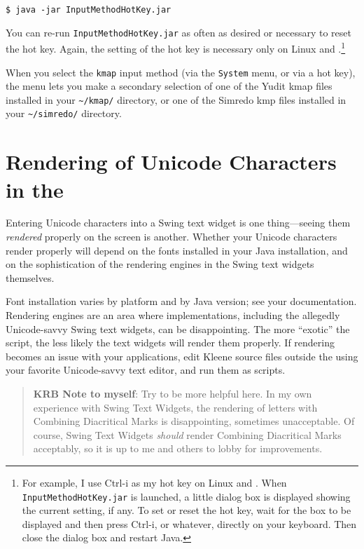 \begin{Verbatim}
$ java -jar InputMethodHotKey.jar
\end{Verbatim}

\noindent
You can re-run \texttt{InputMethodHotKey.jar} as often as desired
or necessary to reset the hot key.
Again, the setting of the hot key is necessary only on Linux and
.\footnote{For example, I use Ctrl-i as my hot key on Linux
and .  When \texttt{InputMethodHotKey.jar} is launched, a
little dialog box is displayed showing the current setting, if any.  To
set or reset the hot key, wait for the box to be displayed and then press
Ctrl-i, or whatever, directly on your keyboard. Then close the dialog box
and restart Java.}

When you select the \texttt{kmap} input method (via the \texttt{System}
menu, or via a hot key), the menu lets you make a secondary selection of
one of the Yudit kmap files installed in your \texttt{\~{}/kmap/}
directory, or one of the Simredo kmp files installed in your
\texttt{\~{}/simredo/} directory.

\section{Rendering of Unicode Characters in the }

Entering Unicode characters into a Swing text widget is one
thing---seeing them \emph{rendered} properly on the screen is another.
Whether your Unicode characters render properly will depend on the fonts
installed in your Java installation, and on the sophistication of the
rendering engines in the Swing text widgets themselves.

Font installation varies by platform and by Java version; see your
documentation.  Rendering engines are an area where
implementations, including the allegedly Unicode-savvy Swing text
widgets, can be disappointing.  The more ``exotic'' the script,
the less likely the text widgets will render them properly.  If
rendering becomes an issue with your applications, edit 
Kleene source files outside the  using your favorite Unicode-savvy text editor,
and run them as scripts.

\begin{quote}
\textbf{KRB Note to myself}: Try to be more helpful here.  In my own
experience with Swing Text Widgets, the rendering of letters with
Combining Diacritical Marks is disappointing, sometimes unacceptable.  Of
course, Swing Text Widgets \emph{should} render Combining Diacritical
Marks acceptably, so it is up to me and others to lobby for improvements.
\end{quote}

